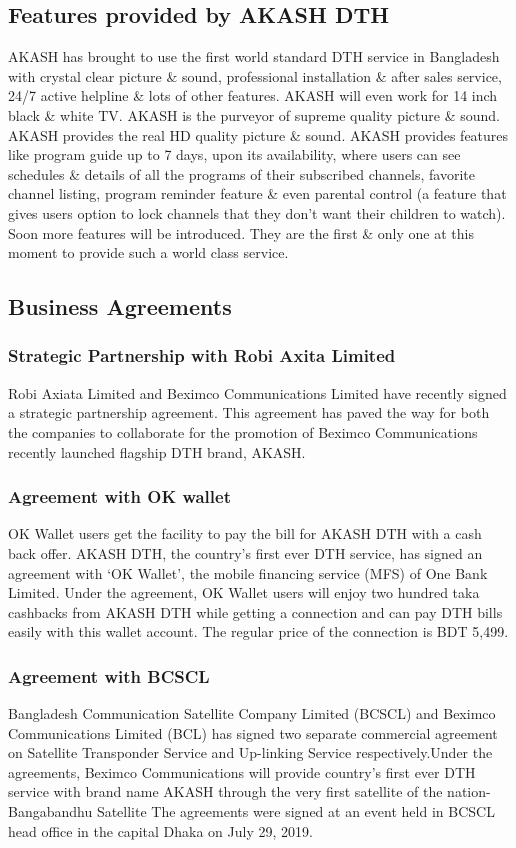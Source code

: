 \begin{spacing}{1.0}
\subsection{Features provided by AKASH DTH}
AKASH has brought to use the first world standard DTH service in Bangladesh with crystal clear picture \& sound, professional installation \& after sales service, 24/7 active helpline \& lots of other features. AKASH will even work for 14 inch black \& white TV. AKASH is the purveyor of supreme quality picture \& sound.  AKASH provides the real HD quality picture \& sound. AKASH provides features like program guide up to 7 days, upon its availability, where users can see schedules \& details of all the programs of their subscribed channels, favorite channel listing, program reminder feature \& even parental control (a feature that gives users option to lock channels that they don't want their children to watch). Soon more features will be introduced. They are the first \& only one at this moment to provide such a world class service.
\subsection{Business Agreements}
\subsubsection{Strategic Partnership with Robi Axita Limited}
Robi Axiata Limited and Beximco Communications Limited have recently signed a strategic partnership agreement. This agreement has paved the way for both the companies to collaborate for the promotion of Beximco Communications recently launched flagship DTH brand, AKASH.
\subsubsection{Agreement with OK wallet}
OK Wallet users get the facility to pay the bill for AKASH DTH with a cash back offer. AKASH DTH, the country's first ever DTH service, has signed an agreement with ‘OK Wallet’, the mobile financing service (MFS) of One Bank Limited. Under the agreement, OK Wallet users will enjoy two hundred taka cashbacks from AKASH DTH while getting a connection and can pay DTH bills easily with this wallet account. The regular price of the connection is BDT 5,499.
\subsubsection{Agreement with BCSCL}
Bangladesh Communication Satellite Company Limited (BCSCL) and Beximco Communications Limited (BCL) has signed two separate commercial agreement on Satellite Transponder Service and Up-linking Service respectively.Under the agreements, Beximco Communications will provide country’s first ever DTH service with brand name AKASH through the very first satellite of the nation- Bangabandhu Satellite The agreements were signed at an event held in BCSCL head office in the capital Dhaka on July 29, 2019.

\end{spacing}
